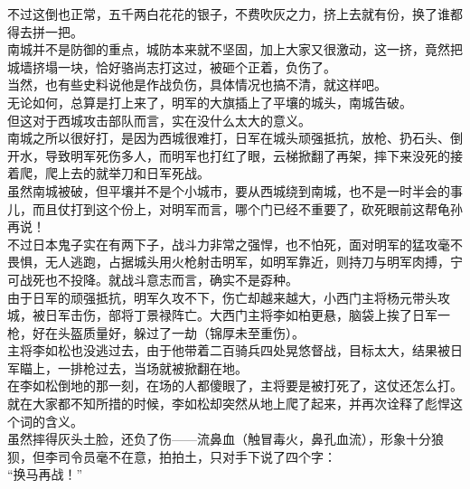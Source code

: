 \begin{multicols}{\theparacolNo}
不过这倒也正常，五千两白花花的银子，不费吹灰之力，挤上去就有份，换了谁都得去拼一把。\\

南城并不是防御的重点，城防本来就不坚固，加上大家又很激动，这一挤，竟然把城墙挤塌一块，恰好骆尚志打这过，被砸个正着，负伤了。\\

当然，也有些史料说他是作战负伤，具体情况也搞不清，就这样吧。\\

无论如何，总算是打上来了，明军的大旗插上了平壤的城头，南城告破。\\

但这对于西城攻击部队而言，实在没什么太大的意义。\\

南城之所以很好打，是因为西城很难打，日军在城头顽强抵抗，放枪、扔石头、倒开水，导致明军死伤多人，而明军也打红了眼，云梯掀翻了再架，摔下来没死的接着爬，爬上去的就举刀和日军死战。\\

虽然南城被破，但平壤并不是个小城市，要从西城绕到南城，也不是一时半会的事儿，而且仗打到这个份上，对明军而言，哪个门已经不重要了，砍死眼前这帮龟孙再说！\\

不过日本鬼子实在有两下子，战斗力非常之强悍，也不怕死，面对明军的猛攻毫不畏惧，无人逃跑，占据城头用火枪射击明军，如明军靠近，则持刀与明军肉搏，宁可战死也不投降。就战斗意志而言，确实不是孬种。\\

由于日军的顽强抵抗，明军久攻不下，伤亡却越来越大，小西门主将杨元带头攻城，被日军击伤，部将丁景禄阵亡。大西门主将李如柏更悬，脑袋上挨了日军一枪，好在头盔质量好，躲过了一劫（锦厚未至重伤）。\\

主将李如松也没逃过去，由于他带着二百骑兵四处晃悠督战，目标太大，结果被日军瞄上，一排枪过去，当场就被掀翻在地。\\

在李如松倒地的那一刻，在场的人都傻眼了，主将要是被打死了，这仗还怎么打。\\

就在大家都不知所措的时候，李如松却突然从地上爬了起来，并再次诠释了彪悍这个词的含义。\\

虽然摔得灰头土脸，还负了伤——流鼻血（触冒毒火，鼻孔血流），形象十分狼狈，但李司令员毫不在意，拍拍土，只对手下说了四个字：\\

“换马再战！”\\


\end{multicols}

